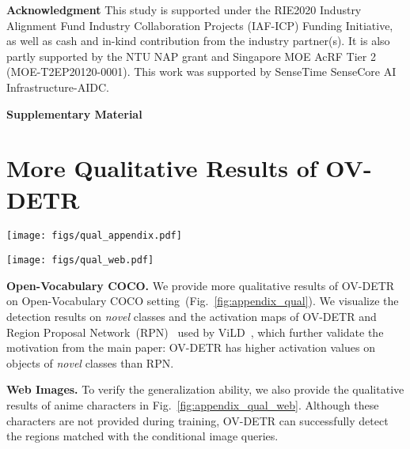 \documentclass[runningheads]{llncs}
\newcommand{\methodname}{OV-DETR\xspace}
\begin{document}
\noindent \textbf{Acknowledgment}
This study is supported under the RIE2020 Industry Alignment Fund Industry Collaboration Projects (IAF-ICP) Funding Initiative, as well as cash and in-kind contribution from the industry partner(s). It is also partly supported by the NTU NAP grant and Singapore MOE AcRF Tier 2 (MOE-T2EP20120-0001). This work was supported by SenseTime SenseCore AI Infrastructure-AIDC.  
\clearpage


\clearpage
\appendix
\begin{center}
 \textbf{\large Supplementary Material}
\end{center}

\section{More Qualitative Results of \methodname}
\begin{figure*}[t]
\begin{minipage}{1.0 \linewidth}
\centering
   \texttt{[image: figs/qual\_appendix.pdf]}
   \caption{
   \textbf{Qualitative results on Open-Vocabulary COCO setting.}
   We visualize the prediction results of \methodname on \emph{novel} classes.
   We also provide the comparison of activation maps between ours and the RPN network.
   \newline
   }
   \label{fig:appendix_qual}
\end{minipage}
\begin{minipage}{1.0 \linewidth}
\texttt{[image: figs/qual\_web.pdf]}
   \caption{
   \textbf{Qualitative results on anime characters.} These images are collected from web. We use the model trained on LVIS dataset to check the matchability with the given conditional image queries.
   }
   \label{fig:appendix_qual_web}
\end{minipage}
\end{figure*}

\noindent \textbf{Open-Vocabulary COCO.}
We provide more qualitative results of \methodname on Open-Vocabulary COCO setting~(Fig.~\ref{fig:appendix_qual}).
We visualize the detection results on \emph{novel} classes and the activation maps of \methodname and Region Proposal Network~(RPN)~\cite{ren2015faster} used by ViLD~\cite{gu2021open}, which further validate the motivation from the main paper: \methodname has higher activation values on objects of \emph{novel} classes than RPN.

\noindent \textbf{Web Images.}
To verify the generalization ability, we also provide the qualitative results of anime characters in Fig.~\ref{fig:appendix_qual_web}.
Although these characters are not provided during training, \methodname can successfully detect the regions matched with the conditional image queries.
\end{document}
